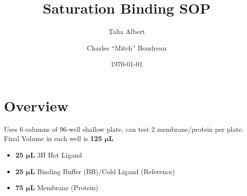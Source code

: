 \documentclass[12pt, letterpaper]{article}
\title{Saturation Binding SOP}
\author{
    Talia Albert
    \and
    Charles ``Mitch'' Boudreau
}
\date{\today}
\begin{document}
\maketitle
\tableofcontents

\section{Overview}
Uses 6 columns of 96-well shallow plate, can test 2 membrane/protein per plate. Final Volume in each well is \textbf{125 $\bm{\mu}$L}
\begin{itemize}
    \item \textbf{25 $\bm{\mu}$L} 3H Hot Ligand
    \item \textbf{25 $\bm{\mu}$L} Binding Buffer (BB)/Cold Ligand (Reference)
    \item \textbf{75 $\bm{\mu}$L} Membrane (Protein)
\end{itemize}
\end{document}
